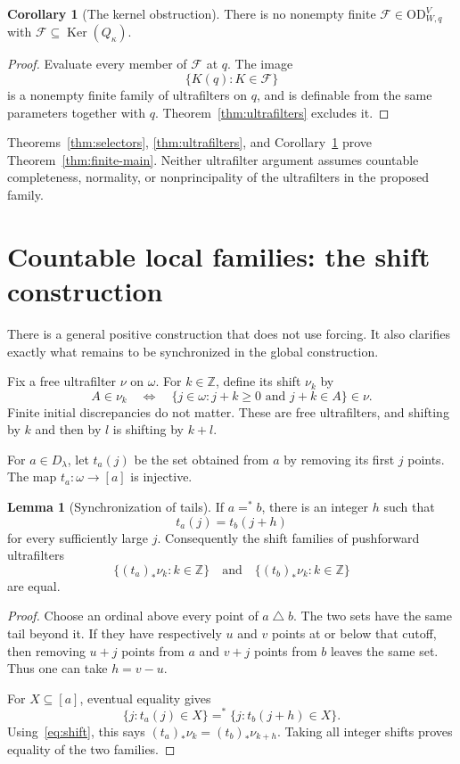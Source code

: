 \documentclass[11pt,letterpaper]{article}
\theoremstyle{definition}
\newtheorem{lemma}[definition]{Lemma}
\newtheorem{corollary}[definition]{Corollary}
\numberwithin{equation}{section}
\newcommand{\OD}{\mathrm{OD}}
\newcommand{\FF}{\mathcal F}
\newcommand{\Ker}{\operatorname{Ker}}
\newcommand{\symdiff}{\mathbin{\triangle}}
\newcommand{\ODW}{\OD^{V}_{W,q}}
\begin{document}
\begin{corollary}[The kernel obstruction]\label{cor:kernels}
There is no nonempty finite $\FF\in\ODW$ with $\FF\subseteq\Ker(Q_\kappa)$.
\end{corollary}
\begin{proof}
Evaluate every member of $\FF$ at $q$. The image
\[
\{K(q):K\in\FF\}
\]
is a nonempty finite family of ultrafilters on $q$, and is definable from the same parameters together with $q$. Theorem~\ref{thm:ultrafilters} excludes it.
\end{proof}

Theorems~\ref{thm:selectors}, \ref{thm:ultrafilters}, and Corollary~\ref{cor:kernels} prove Theorem~\ref{thm:finite-main}. Neither ultrafilter argument assumes countable completeness, normality, or nonprincipality of the ultrafilters in the proposed family.

\section{Countable local families: the shift construction}\label{sec:local}

There is a general positive construction that does not use forcing. It also clarifies exactly what remains to be synchronized in the global construction.

Fix a free ultrafilter $\nu$ on $\omega$. For $k\in\mathbb Z$, define its shift $\nu_k$ by
\begin{equation}\label{eq:shift}
A\in\nu_k\quad\Longleftrightarrow\quad
\{j\in\omega:j+k\geq0\text{ and }j+k\in A\}\in\nu.
\end{equation}
Finite initial discrepancies do not matter. These are free ultrafilters, and shifting by $k$ and then by $l$ is shifting by $k+l$.

For $a\in D_\lambda$, let $t_a(j)$ be the set obtained from $a$ by removing its first $j$ points. The map $t_a:\omega\to[a]$ is injective.

\begin{lemma}[Synchronization of tails]\label{lem:tails}
If $a=^*b$, there is an integer $h$ such that
\[
t_a(j)=t_b(j+h)
\]
for every sufficiently large $j$. Consequently the shift families of pushforward ultrafilters
\[
\{(t_a)_*\nu_k:k\in\mathbb Z\}
\quad\text{and}\quad
\{(t_b)_*\nu_k:k\in\mathbb Z\}
\]
are equal.
\end{lemma}
\begin{proof}
Choose an ordinal above every point of $a\symdiff b$. The two sets have the same tail beyond it. If they have respectively $u$ and $v$ points at or below that cutoff, then removing $u+j$ points from $a$ and $v+j$ points from $b$ leaves the same set. Thus one can take $h=v-u$.

For $X\subseteq[a]$, eventual equality gives
\[
\{j:t_a(j)\in X\}=^*\{j:t_b(j+h)\in X\}.
\]
Using~\eqref{eq:shift}, this says $(t_a)_*\nu_k=(t_b)_*\nu_{k+h}$. Taking all integer shifts proves equality of the two families.
\end{proof}
\end{document}
